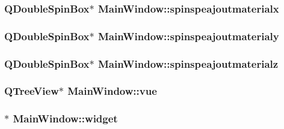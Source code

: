 \hypertarget{class_main_window_a41b46a41873912e43f60feafeec48f2f}{
\subsubsection[{spinspeajoutmaterialx}]{\setlength{\rightskip}{0pt plus 5cm}Q\+Double\+Spin\+Box$\ast$ Main\+Window\+::spinspeajoutmaterialx\hspace{0.3cm}{\ttfamily [private]}}}\label{class_main_window_a41b46a41873912e43f60feafeec48f2f}
\hypertarget{class_main_window_af5f3e81215640c685afbe36ea30926eb}{
\subsubsection[{spinspeajoutmaterialy}]{\setlength{\rightskip}{0pt plus 5cm}Q\+Double\+Spin\+Box$\ast$ Main\+Window\+::spinspeajoutmaterialy\hspace{0.3cm}{\ttfamily [private]}}}\label{class_main_window_af5f3e81215640c685afbe36ea30926eb}
\hypertarget{class_main_window_abfa1370458910b22754b3a2f9dcf8079}{
\subsubsection[{spinspeajoutmaterialz}]{\setlength{\rightskip}{0pt plus 5cm}Q\+Double\+Spin\+Box$\ast$ Main\+Window\+::spinspeajoutmaterialz\hspace{0.3cm}{\ttfamily [private]}}}\label{class_main_window_abfa1370458910b22754b3a2f9dcf8079}
\hypertarget{class_main_window_ac0150259862bd3b40a76b35a00b9e97a}{
\subsubsection[{vue}]{\setlength{\rightskip}{0pt plus 5cm}Q\+Tree\+View$\ast$ Main\+Window\+::vue\hspace{0.3cm}{\ttfamily [private]}}}\label{class_main_window_ac0150259862bd3b40a76b35a00b9e97a}
\hypertarget{class_main_window_a0a21ff789dee5a19a74d2461cf0820dc}{
\subsubsection[{widget}]{$\ast$ Main\+Window\+::widget\hspace{0.3cm}{\ttfamily [private]}}}\label{class_main_window_a0a21ff789dee5a19a74d2461cf0820dc}

